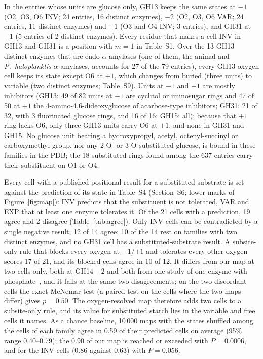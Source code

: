 \documentclass[preprint,12pt]{elsarticle}
\begin{document}
In the entries whose units are glucose only, GH13 keeps the same states at $-1$ (O2, O3, O6 INV; 24 entries, 16
distinct enzymes), $-2$ (O2, O3, O6 VAR; 24 entries, 11 distinct enzymes) and $+1$ (O3 and O4 INV; 3 entries), and GH31 at $-1$
(5 entries of 2 distinct enzymes). Every residue that makes a cell INV in GH13 and GH31 is a position with $m = 1$ in
Table~S1. Over the 13 GH13 distinct enzymes that are endo-$\alpha$-amylases (one of them, the animal and
\emph{P.~haloplanktis} $\alpha$-amylases, accounts for 27 of the 79 entries), every GH13 oxygen cell keeps its state except O6
at $+1$, which changes from buried (three units) to variable (two distinct enzymes; Table~S9). Units at $-1$ and $+1$ are
mostly inhibitors (GH13: 49 of 82 units at $-1$ are cyclitol or iminosugar rings and 47 of 50 at $+1$ the
4-amino-4,6-dideoxyglucose of acarbose-type inhibitors; GH31: 21 of 32, with 3 fluorinated glucose rings, and 16 of
16; GH15: all); because that $+1$
ring lacks O6, only three GH13 units carry O6 at $+1$, and none in GH31 and GH15. No glucose unit bearing a hydroxypropyl, acetyl,
octenyl-succinyl or carboxymethyl group, nor any 2-O- or 3-O-substituted glucose, is bound in these families in the
PDB; the 18 substituted rings found among the 637 entries carry their substituent on O1 or O4.

Every cell with a published positional result for a substituted substrate is set against the prediction of its state in Table~S4
(Section~S6; lower marks of Figure~\ref{fig:map}): INV predicts that the substituent is not tolerated, VAR and EXP that at least one enzyme tolerates it. Of the 21 cells with a prediction, 19 agree and 2 disagree
(Table~\ref{tab:agree}). Only INV cells can be contradicted by a single negative result; 12 of 14 agree; 10 of the 14 rest on families
with two distinct enzymes, and no GH31 cell has a substituted-substrate result. A subsite-only rule that blocks every
oxygen at $-1$/$+1$ and tolerates every other oxygen scores 17 of 21, and its blocked cells agree in 10 of 12. It
differs from our map at two cells only, both at GH14 $-2$ and both from one study of one enzyme with
phosphate~\citep{Takeda1987}, and it fails at the same two disagreements; on the two discordant cells the exact McNemar
test (a paired test on the cells where the two maps differ) gives $p = 0.50$. The oxygen-resolved map therefore adds two cells to a subsite-only rule, and its value for
substituted starch lies in the variable and free cells it names. As a chance baseline, 10\,000 maps with the states shuffled among the cells of each family
agree in 0.59 of their predicted cells on average (95\% range 0.40--0.79); the 0.90 of our map is reached or exceeded
with $P = 0.0006$, and for the INV cells (0.86 against 0.63) with $P = 0.056$.
\end{document}
